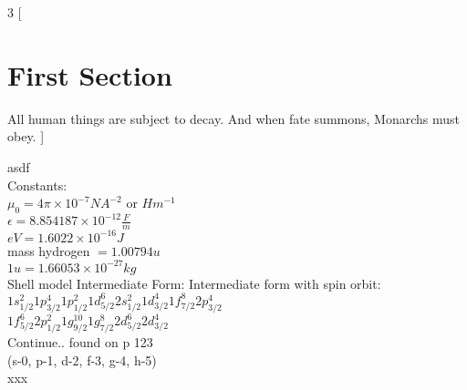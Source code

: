 \documentclass{article}
\begin{document}
\begin{multicols}{3}
[
\section{First Section}
All human things are subject to decay. And when fate summons, Monarchs must obey.
]

asdf\\


Constants:\\
$\mu_{0} = 4 \pi \times 10 ^{-7} NA^{-2}$ or $Hm^{-1} $\\
$\epsilon = 8.854187 \times 10 ^{-12} \frac{F}{m}$\\	
$eV = 1.6022\times 10 ^{-16} J$\\
mass hydrogen $ = 1.00794u  $\\
$1u = 1.66053 \times 10^{-27} kg $\\

Shell model
Intermediate Form:
Intermediate form with spin orbit:\\
$1s_{1/2}^{2} 1p_{3/2}^{4} 1p_{1/2}^{2} 1d_{5/2}^{6} 2s_{1/2}^{2} 1d_{3/2}^{4} 1f_{7/2}^{8} 2p_{3/2}^{4} $\\
$1f_{5/2}^{6} 2p_{1/2}^{2} 1g_{9/2}^{10} 1g_{7/2}^{8} 2d_{5/2}^{6} 2d_{3/2}^{4}$\\
Continue.. found on p 123\\
(s-0, p-1, d-2, f-3, g-4, h-5)\\


xxx


\end{multicols}
\end{document}
